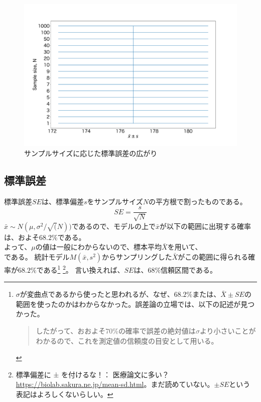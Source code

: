 \begin{figure}
    \begin{center}
        \includegraphics[width=15cm]{./image/10_/Norm_standard_deviation.pdf}
        \caption{サンプルサイズに応じた標準誤差の広がり}
    \end{center}
\end{figure}



\subsection{標準誤差}
標準誤差$SE$は、標準偏差$s$をサンプルサイズ$N$の平方根で割ったものである。
\begin{equation*}
    SE = \frac{s}{\sqrt{N}}
\end{equation*}
$\bar{x}\sim N(\mu,\sigma^2/\sqrt(N))$であるので、モデルの上で$\bar{x}$が以下の範囲に出現する確率は、およそ$68.2\%$である。
\begin{equation*}
    [\bar{\mu}-SE,\bar{\mu}+SE]
\end{equation*}
よって、$\mu$の値は一般にわからないので、標本平均$\bar{X}$を用いて、
\begin{equation*}
    [\bar{X}-SE,\bar{X}+SE]
\end{equation*}
である。
統計モデル$M(\bar{x},s^2)$からサンプリングした$\bar{X}$がこの範囲に得られる確率が$68.2\%$である\footnote{$\sigma$が変曲点であるから使ったと思われるが、なぜ、$68.2\%$または、$\bar{X}\pm SE$の範囲を使ったのかはわからなかった。誤差論の立場では、以下の記述が見つかった\cite{誤差の取り扱い_神戸大学}。
\begin{quote}
    したがって、おおよそ$70\%$の確率で誤差の絶対値は$\sigma$より小さいことがわかるので、これを測定値の信頼度の目安として用いる。
\end{quote}
}
\footnote{標準偏差に ± を付けるな！： 医療論文に多い？
\url{https://biolab.sakura.ne.jp/mean-sd.html}。まだ読めていない。$\pm SE$という表記はよろしくないらしい。}。
言い換えれば、$SE$は、$68\%$信頼区間である。



